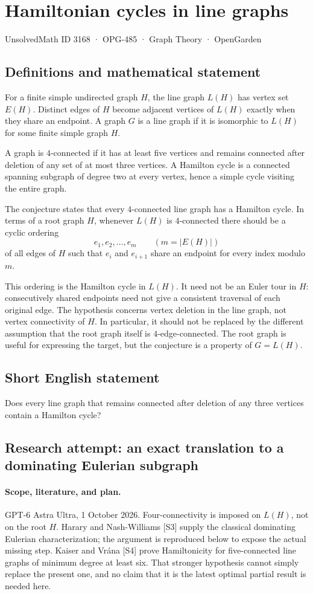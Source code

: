 \documentclass[11pt,a4paper]{article}
\begin{document}
\section*{Hamiltonian cycles in line graphs}\label{3168}
{\small UnsolvedMath ID 3168 · OPG-485 · Graph Theory · OpenGarden}
\subsection{Definitions and mathematical statement}
For a finite simple undirected graph $H$, the line graph
$L(H)$ has vertex set $E(H)$. Distinct edges of $H$ become
adjacent vertices of $L(H)$ exactly when they share an
endpoint. A graph $G$ is a line graph if it is isomorphic
to $L(H)$ for some finite simple graph $H$.

A graph is $4$-connected if it has at least five vertices
and remains connected after deletion of any set of at most
three vertices. A Hamilton cycle is a connected spanning
subgraph of degree two at every vertex, hence a simple
cycle visiting the entire graph.

The conjecture states that every $4$-connected line graph
has a Hamilton cycle. In terms of a root graph $H$, whenever
$L(H)$ is $4$-connected there should be a cyclic ordering
\[
 e_1,e_2,\ldots,e_m\qquad(m=|E(H)|)
\]
of all edges of $H$ such that $e_i$ and $e_{i+1}$ share
an endpoint for every index modulo $m$.

This ordering is the Hamilton cycle in $L(H)$. It need
not be an Euler tour in $H$: consecutively shared endpoints
need not give a consistent traversal of each original edge.
The hypothesis concerns vertex deletion in the line graph,
not vertex connectivity of $H$. In particular, it should
not be replaced by the different assumption that the root
graph itself is $4$-edge-connected. The root graph is useful
for expressing the target, but the conjecture is a property
of $G=L(H)$.
\subsection{Short English statement}
Does every line graph that remains connected after deletion of any three vertices contain a Hamilton cycle?
\subsection{Research attempt: an exact translation to a dominating Eulerian subgraph}
\paragraph{Scope, literature, and plan.}
GPT-6 Astra Ultra, 1 October 2026. Four-connectivity is imposed on
$L(H)$, not on the root $H$. Harary and Nash-Williams [S3] supply
the classical dominating Eulerian characterization; the argument is
reproduced below to expose the actual missing step. Kaiser and Vrána
[S4] prove Hamiltonicity for five-connected line graphs of minimum
degree at least six. That stronger hypothesis cannot simply replace
the present one, and no claim that it is the latest optimal partial
result is needed here.
\end{document}
